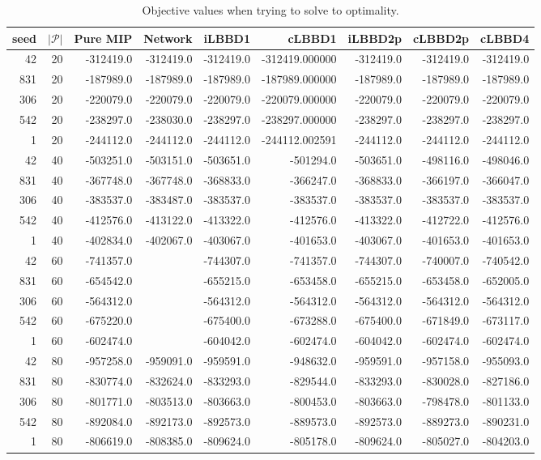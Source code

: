\begin{table*}
    \centering
    \caption{Objective values when trying to solve to optimality.}
    \begin{tabular}{rrrrrrrrr} \toprule
        seed & $|\mathcal{P}|$ & Pure MIP & Network & iLBBD1 & cLBBD1 & iLBBD2p & cLBBD2p & cLBBD4 \\\midrule
  42      &      20         & -312419.0 &    -312419.0     & -312419.0 &-312419.000000 & -312419.0 & -312419.0 & -312419.0 \\
 831      &      20         & -187989.0  &   -187989.0     &-187989.0 & -187989.000000 & -187989.0 & -187989.0 &-187989.0 \\
  306      &      20       & -220079.0 &   -220079.0        &-220079.0 & -220079.000000 & -220079.0 & -220079.0 & -220079.0 \\
 542       &     20        & -238297.0 &  -238030.0        &-238297.0 & -238297.000000 & -238297.0 & -238297.0 & -238297.0 \\
    1      &      20       & -244112.0 &  -244112.0        &-244112.0 & -244112.002591 & -244112.0  & -244112.0 & -244112.0 \\\midrule
    42       &    40& -503251.0& -503151.0&-503651.0& -501294.0& -503651.0& -498116.0& -498046.0 \\
    831     &       40& -367748.0&-367748.0& -368833.0& -366247.0& -368833.0& -366197.0& -366047.0 \\
    306   &         40& -383537.0&-383487.0& -383537.0& -383537.0& -383537.0& -383537.0& -383537.0 \\
    542   &         40& -412576.0&-413122.0& -413322.0& -412576.0& -413322.0& -412722.0& -412576.0 \\
    1     &       40& -402834.0&-402067.0& -403067.0& -401653.0& -403067.0& -401653.0& -401653.0 \\\midrule
    42     &       60 &-741357.0&& -744307.0& -741357.0 &-744307.0& -740007.0& -740542.0 \\
    831   &         60& -654542.0&& -655215.0& -653458.0& -655215.0& -653458.0 &-652005.0\\
    306    &        60& -564312.0&& -564312.0& -564312.0 &-564312.0& -564312.0& -564312.0\\
    542     &       60& -675220.0&& -675400.0& -673288.0& -675400.0& -671849.0& -673117.0\\
    1       &     60 &-602474.0&& -604042.0& -602474.0& -604042.0 &-602474.0& -602474.0\\\midrule
    42       &     80 &-957258.0 &-959091.0& -959591.0& -948632.0& -959591.0& -957158.0 &-955093.0\\
    831      &      80& -830774.0& -832624.0& -833293.0& -829544.0& -833293.0 &-830028.0& -827186.0\\
    306      &      80& -801771.0& -803513.0& -803663.0& -800453.0& -803663.0& -798478.0& -801133.0\\
    542      &      80& -892084.0& -892173.0& -892573.0& -889573.0& -892573.0& -889273.0& -890231.0\\
    1        &    80& -806619.0 &-808385.0& -809624.0& -805178.0 &-809624.0& -805027.0 &-804203.0\\

    \bottomrule
    \end{tabular}
\end{table*}
